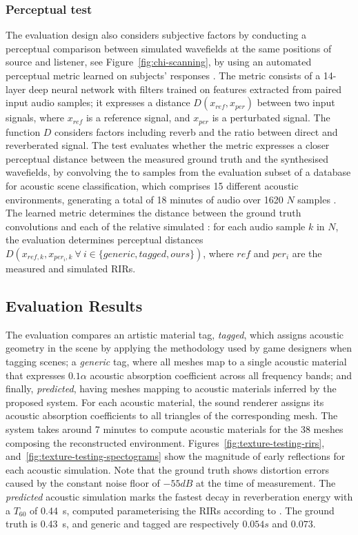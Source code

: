\subsubsection{Perceptual test}
The evaluation design also considers subjective factors by conducting a perceptual comparison between simulated wavefields at the same positions of source and listener, see Figure~\ref{fig:chi-scanning}, by using an automated perceptual metric learned on subjects’ responses \citep{manocha2020differentiable}. The metric consists of a 14-layer deep neural network with filters trained on features extracted from paired input audio samples; it expresses a distance $D(x_{ref}, x_{per})$ between two input signals, where $x_{ref}$ is a reference signal, and $x_{per}$ is a perturbated signal. The function $D$ considers factors including reverb and the ratio between direct and reverberated signal. The test evaluates whether the metric expresses a closer perceptual distance between the measured ground truth and the synthesised wavefields, by convolving the  to samples from the evaluation subset of a database for acoustic scene classification, which comprises 15 different acoustic environments, generating a total of 18 minutes of audio over 1620 $N$ samples \citep{mesaros2016tut}. The learned metric determines the distance between the ground truth convolutions and each of the relative simulated : for each audio sample $k$ in $N$, the evaluation determines perceptual distances $D(x_{ref, k}, x_{per_i, k}~\forall~i \in \{generic, tagged, ours\})$, where $ref$ and $per_i$ are the measured and simulated RIRs.

\subsection{Evaluation Results}
The evaluation compares an artistic material tag, \emph{tagged}, which assigns acoustic geometry in the scene by applying the methodology used by game designers when tagging scenes; a \emph{generic} tag, where all meshes map to a single acoustic material that expresses $0.1\alpha$ acoustic absorption coefficient across all frequency bands; and finally, \emph{predicted}, having meshes mapping to acoustic materials inferred by the proposed system. For each acoustic material, the sound renderer assigns its acoustic absorption coefficients to all triangles of the corresponding mesh.
The system takes around 7 minutes to compute acoustic materials for the 38 meshes composing the reconstructed environment.
Figures~\ref{fig:texture-testing-rirs}, and~\ref{fig:texture-testing-spectograms} show the magnitude of early reflections for each acoustic simulation. Note that the ground truth shows distortion errors caused by the constant noise floor of $-55dB$ at the time of measurement. The \emph{predicted} acoustic simulation marks the fastest decay in reverberation energy with a $T_{60}$ of \qty{0.44}{\second}, computed parameterising the RIRs according to \cite{lima_RIR_Parameters}. The ground truth is \qty{0.43}{\second}, and generic and tagged are respectively $0.054s$ and $0.073$.

